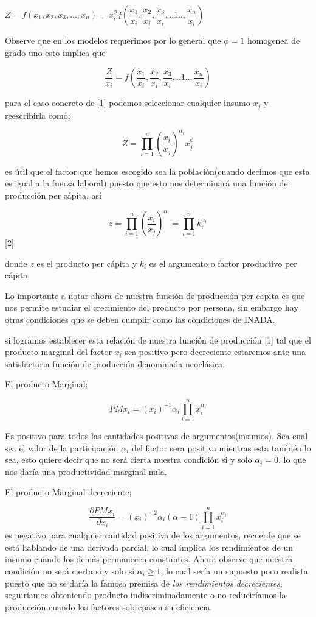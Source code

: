 \documentclass[12pt]{article}
\begin{document}
$Z = f(x_1,x_2,x_3,...,x_n) =  x_i^\phi f( \dfrac{x_1}{x_i},\dfrac{x_2}{x_i},\dfrac{x_3}{x_i},..1..,\dfrac{x_n}{x_i})$

Observe que en los modelos requerimos por lo general que $\phi=1$ homogenea de grado uno esto implica que 

$$
\dfrac{Z}{x_i}=f( \dfrac{x_1}{x_i},\dfrac{x_2}{x_i},\dfrac{x_3}{x_i},..1..,\dfrac{x_n}{x_i})$$

para el caso concreto de [1] podemos seleccionar cualquier insumo $x_j$ y reescribirla como; 


$$Z=\prod_{i=1}^n \left( \frac{x_i}{x_j}\right)^{\alpha_i} x_j^{\phi}$$


es útil que el factor que hemos escogido sea la población(cuando decimos que esta es igual a la fuerza laboral) puesto que esto nos determinará una función de producción per cápita, así


 $$z=\prod_{i=1}^n \left( \frac{x_i}{x_j}\right)^{\alpha_i}  =\prod_{i=1}^n k_{i}^{\alpha_i}$$  [2]

donde $z$ es el producto per cápita y $k_{i}$ es el argumento o factor productivo per cápita.

Lo importante a notar ahora de nuestra función de producción per capita es que nos permite estudiar el crecimiento del producto por persona, sin embargo hay otras condiciones que se deben cumplir como las condiciones de INADA.

si logramos establecer esta relación de nuestra función de producción [1] tal que el producto marginal del factor $x_{i}$ sea positivo pero decreciente estaremos ante una satisfactoria función de producción denominada neoclásica.


El producto Marginal; 

$$PMx_i=(x_i)^{-1}\alpha_i\prod_{i=1}^nx_i^{\alpha_i}$$

Es positivo para todos las cantidades positivas de argumentos(insumos). Sea cual sea el valor de la participación $\alpha_i$ del factor sera positiva mientras esta también lo sea, esto quiere decir que no será cierta nuestra condición si y solo $\alpha_{i}=0$. lo que nos daría una productividad marginal nula.


El producto Marginal decreciente;

$$\frac{\partial PMx_i}{\partial x_i}=(x_i)^{-2}\alpha_i(\alpha - 1)\prod_{i=1}^nx_i^{\alpha_i}$$
es negativo para cualquier cantidad positiva de los argumentos, recuerde que se está hablando de una derivada parcial, lo cual implica los rendimientos de un insumo cuando los demás permanecen constantes. Ahora observe que nuestra condición no será cierta si y solo si $\alpha_i \geq 1$, lo cual sería un supuesto poco realista puesto que no se daría la famosa premisa de \textit{los rendimientos decrecientes}, seguiríamos obteniendo producto indiscriminadamente o no reduciríamos la producción cuando los factores sobrepasen su eficiencia.
\end{document}

